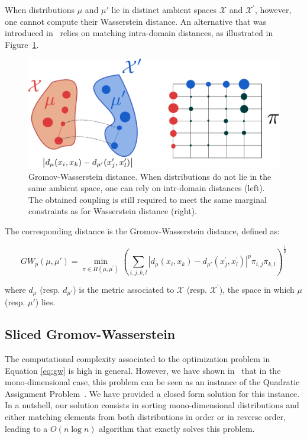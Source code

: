 When distributions $\mu$ and $\mu'$ lie in distinct ambient spaces $\mathcal{X}$
and $\mathcal{X}^\prime$,
however, one cannot compute their Wasserstein distance. An alternative that was
introduced in~\cite{memoli2011gromov} relies on matching intra-domain
distances, as illustrated in Figure~\ref{fig:gw}.

\begin{figure}
\centering
\includegraphics[width=.6\textwidth]{fig/gw}
\caption{Gromov-Wasserstein distance. When distributions do not lie
in the same ambient space, one can rely on intr-domain distances (left).
The obtained coupling is still required to meet the same
marginal constraints as for Wasserstein distance (right).\label{fig:gw}}
\end{figure}

The corresponding distance is the Gromov-Wasserstein distance, defined as:

\begin{equation}
    GW_p(\mu, \mu') = \min_{\pi \in \Pi(\mu, \mu^\prime)}
        \left(
            \sum_{i,j,k,l}
            \left| d_\mu(x_i, x_k) - d_{\mu'}(x^\prime_j, x^\prime_l) \right|^p
            \pi_{i,j} \pi_{k,l}
        \right)^{\frac{1}{p}}
    \label{eq:gw}
\end{equation}

\noindent
where $d_\mu$ (resp. $d_{\mu'}$) is the metric associated to $\mathcal{X}$
(resp. $\mathcal{X}^\prime$), the space in which $\mu$ (resp. $\mu'$) lies.

\subsection{Sliced Gromov-Wasserstein}

The computational complexity associated to the optimization problem in
Equation \eqref{eq:gw} is high in general.
However, we have shown in~\cite{vayer:hal-02174309} that in the
mono-dimensional case, this problem can be seen as an instance of the Quadratic
Assignment Problem~\cite{koopmans1957assignment}.
We have provided a closed form solution for this instance.
In a nutshell, our solution consists in sorting mono-dimensional distributions
and either matching elements from both distributions in order or in reverse
order, leading to a $O(n \log n)$ algorithm that exactly solves this problem.

